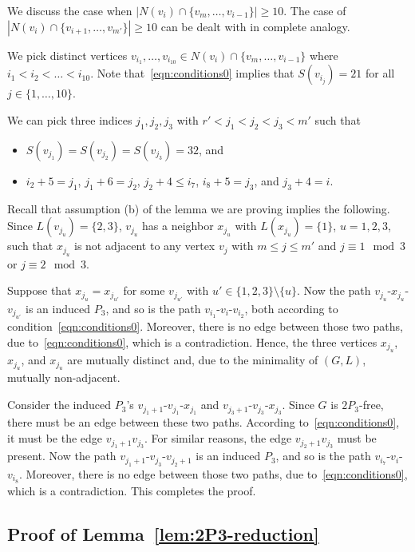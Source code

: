\documentclass[11pt]{article}
\begin{document}
We discuss the case when $|N(v_i) \cap \{v_{m},\ldots,v_{i-1}\}| \ge 10$.
The case of $|N(v_i) \cap \{v_{i+1},\ldots,v_{m'}\}| \ge 10$ can be dealt with in complete analogy.

We pick distinct vertices $v_{i_1},\ldots,v_{i_{10}} \in N(v_i) \cap \{v_{m},\ldots,v_{i-1}\}$ where $i_1<i_2<\ldots<i_{10}$.
Note that~\eqref{eqn:conditions0} implies that $S(v_{i_j})=21$ for all $j \in \{1,\ldots,10\}$.

We can pick three indices $j_1,j_2,j_3$ with $r'< j_1 < j_2 < j_3 < m'$ such that 
\begin{itemize}
	\item $S(v_{j_1})=S(v_{j_2})=S(v_{j_3})=32$, and
	\item $i_2 + 5 = j_1$, $j_1 + 6 = j_2$, $j_2 + 4 \le i_7$, $i_8 + 5 = j_3$, and $j_3 + 4 = i$.
\end{itemize}
Recall that assumption (b) of the lemma we are proving implies the following.
Since $L(v_{j_{u}})=\{2,3\}$, $v_{j_{u}}$ has a neighbor $x_{j_u}$ with $L(x_{j_u})=\{1\}$, $u=1,2,3$, such that $x_{j_u}$ is not adjacent to any vertex $v_j$ with $m \le j \le m'$ and $j \equiv 1 \mod 3$ or $j \equiv 2 \mod 3$.

Suppose that $x_{j_u}=x_{j_{u'}}$ for some $v_{j_{u'}}$ with $u' \in \{1,2,3\}\setminus \{u\}$.
Now the path $v_{j_u}$-$x_{j_u}$-$v_{j_{u'}}$ is an induced $P_3$, and so is the path $v_{i_1}$-$v_i$-$v_{i_2}$, both according to condition~\eqref{eqn:conditions0}.
Moreover, there is no edge between those two paths, due to~\eqref{eqn:conditions0}, which is a contradiction.
Hence, the three vertices $x_{j_u}$, $x_{j_u}$, and $x_{j_u}$ are mutually distinct and, due to the minimality of $(G,L)$, mutually non-adjacent.

Consider the induced $P_3$'s $v_{j_1+1}$-$v_{j_1}$-$x_{j_1}$ and $v_{j_3+1}$-$v_{j_3}$-$x_{j_3}$.
Since $G$ is $2P_3$-free, there must be an edge between these two paths.
According to~\eqref{eqn:conditions0}, it must be the edge $v_{j_1+1}v_{j_3}$.
For similar reasons, the edge $v_{j_2+1}v_{j_3}$ must be present.
Now the path $v_{j_1+1}$-$v_{j_3}$-$v_{j_2+1}$ is an induced $P_3$, and so is the path $v_{i_7}$-$v_i$-$v_{i_8}$.
Moreover, there is no edge between those two paths, due to~\eqref{eqn:conditions0}, which is a contradiction.
This completes the proof.

\subsection{Proof of Lemma~\ref{lem:2P3-reduction}}
\end{document}
